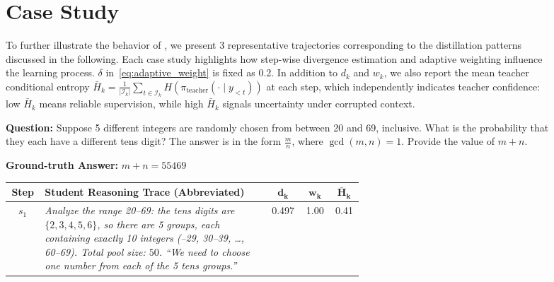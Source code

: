 \begin{figure}[t]




\section{Case Study}
\label{app:casestudy}



To further illustrate the behavior of \ourmodel, we present 3 representative trajectories corresponding to the distillation patterns discussed in the following. 
Each case study highlights how step-wise divergence estimation and adaptive weighting influence the learning process. $\delta$ in~\cref{eq:adaptive_weight} is fixed as 0.2. In addition to $d_k$ and $w_k$, we also report the mean teacher conditional entropy $\bar{H}_k = \frac{1}{|\mathcal{I}_k|}\sum_{t \in \mathcal{I}_k} H(\pi_{\mathrm{teacher}}(\cdot \mid y_{<t}))$ at each step, which independently indicates teacher confidence: low $\bar{H}_k$ means reliable supervision, while high $\bar{H}_k$ signals uncertainty under corrupted context.





\centering


\begin{tcolorbox}[
  colback=white, colframe=black!70, boxrule=0.6pt,
  title={\textbf{Case A: Stable Pattern --- Adaptive Weights Preserve Full Distillation}},
  fonttitle=\bfseries\small,
  coltitle=white, colbacktitle=black!70,
  top=4pt, bottom=4pt, left=6pt, right=6pt
]

\noindent\colorbox{gray!10}{\parbox{0.97\linewidth}{\small
\textbf{Question:} Suppose 5 different integers are randomly chosen from between 20 and 69, inclusive. What is the probability that they each have a different tens digit? The answer is in the form $\frac{m}{n}$, where $\gcd(m, n) = 1$. Provide the value of $m + n$.

 \textbf{Ground-truth Answer:} $m + n = 55469$
}}

\vspace{6pt}

\renewcommand{\arraystretch}{1.3}
{\small
\begin{tabular}{@{} c p{0.64\linewidth} c c c @{}}
\toprule
\textbf{Step} & \textbf{Student Reasoning Trace (Abbreviated)} & $\boldsymbol{d_k}$ & $\boldsymbol{w_k}$ & $\boldsymbol{\bar{H}_k}$ \\
\midrule

$s_1$ &
\textit{Analyze the range 20--69: the tens digits are $\{2, 3, 4, 5, 6\}$, so there are 5 groups, each containing exactly 10 integers (\eg 20--29, 30--39, \ldots, 60--69). Total pool size: $50$.}
\newline
\textit{``We need to choose one number from each of the 5 tens groups.''}
& 0.497 & \cellcolor{green!18} 1.00 & 0.41 \\


\end{tabular}}
\end{tcolorbox}
\end{figure}

